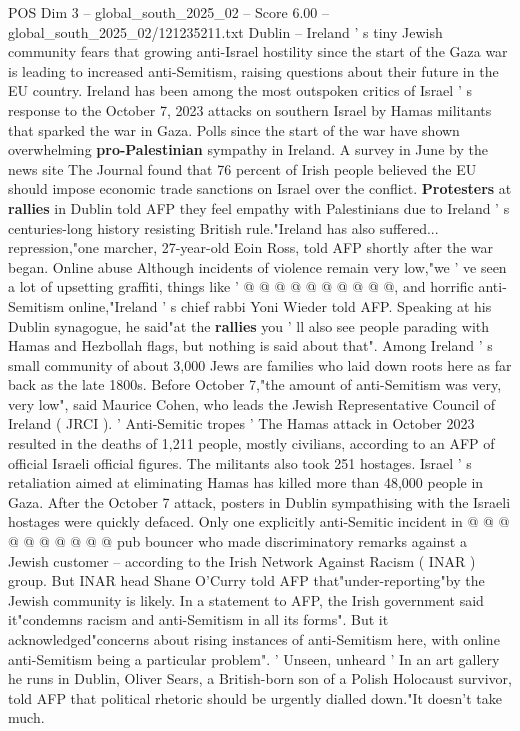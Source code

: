 \begin{textsample}{POS Dim 3 – global\_south\_2025\_02 – Score 6.00 – global\_south\_2025\_02/121235211.txt}  \label{ex:f3_pos_444}
Dublin -- Ireland ' s tiny Jewish community fears that growing anti-Israel hostility since the start of the Gaza war is leading to increased anti-Semitism, raising questions about their future in the EU country.
Ireland has been among the most outspoken critics of Israel ' s response to the October 7, 2023 attacks on southern Israel by Hamas militants that sparked the war in Gaza.
Polls since the start of the war have shown overwhelming \textbf{pro-Palestinian} sympathy in Ireland.
A survey in June by the news site The Journal found that 76 percent of Irish people believed the EU should impose economic trade sanctions on Israel over the conflict. \textbf{Protesters} at \textbf{rallies} in Dublin told AFP they feel empathy with Palestinians due to Ireland ' s centuries-long history resisting British rule."Ireland has also suffered... repression,"one marcher, 27-year-old Eoin Ross, told AFP shortly after the war began.
Online abuse Although incidents of violence remain very low,"we ' ve seen a lot of upsetting graffiti, things like ' @ @ @ @ @ @ @ @ @ @, and horrific anti-Semitism online,"Ireland ' s chief rabbi Yoni Wieder told AFP.
Speaking at his Dublin synagogue, he said"at the \textbf{rallies} you ' ll also see people parading with Hamas and Hezbollah flags, but nothing is said about that".
Among Ireland ' s small community of about 3,000 Jews are families who laid down roots here as far back as the late 1800s.
Before October 7,"the amount of anti-Semitism was very, very low", said Maurice Cohen, who leads the Jewish Representative Council of Ireland ( JRCI ). ' Anti-Semitic tropes ' The Hamas attack in October 2023 resulted in the deaths of 1,211 people, mostly civilians, according to an AFP of official Israeli official figures.
The militants also took 251 hostages.
Israel ' s retaliation aimed at eliminating Hamas has killed more than 48,000 people in Gaza.
After the October 7 attack, posters in Dublin sympathising with the Israeli hostages were quickly defaced.
Only one explicitly anti-Semitic incident in @ @ @ @ @ @ @ @ @ @ pub bouncer who made discriminatory remarks against a Jewish customer -- according to the Irish Network Against Racism ( INAR ) group.
But INAR head Shane O'Curry told AFP that"under-reporting"by the Jewish community is likely.
In a statement to AFP, the Irish government said it"condemns racism and anti-Semitism in all its forms".
But it acknowledged"concerns about rising instances of anti-Semitism here, with online anti-Semitism being a particular problem". ' Unseen, unheard ' In an art gallery he runs in Dublin, Oliver Sears, a British-born son of a Polish Holocaust survivor, told AFP that political rhetoric should be urgently dialled down."It doesn't take much.

\end{textsample}
